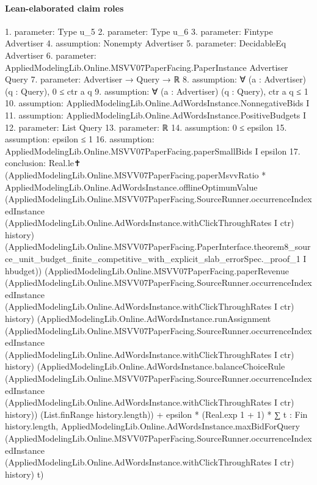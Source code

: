 \documentclass[10pt]{article}
\begin{document}
\paragraph{Lean-elaborated claim roles}\begin{ReviewVerbatim}
1. parameter: Type u_5
2. parameter: Type u_6
3. parameter: Fintype Advertiser
4. assumption: Nonempty Advertiser
5. parameter: DecidableEq Advertiser
6. parameter: AppliedModelingLib.Online.MSVV07PaperFacing.PaperInstance Advertiser Query
7. parameter: Advertiser → Query → ℝ
8. assumption: ∀ (a : Advertiser) (q : Query), 0 ≤ ctr a q
9. assumption: ∀ (a : Advertiser) (q : Query), ctr a q ≤ 1
10. assumption: AppliedModelingLib.Online.AdWordsInstance.NonnegativeBids I
11. assumption: AppliedModelingLib.Online.AdWordsInstance.PositiveBudgets I
12. parameter: List Query
13. parameter: ℝ
14. assumption: 0 ≤ epsilon
15. assumption: epsilon ≤ 1
16. assumption: AppliedModelingLib.Online.MSVV07PaperFacing.paperSmallBids I epsilon
17. conclusion: Real.le✝
  (AppliedModelingLib.Online.MSVV07PaperFacing.paperMsvvRatio *
    AppliedModelingLib.Online.AdWordsInstance.offlineOptimumValue
      (AppliedModelingLib.Online.MSVV07PaperFacing.SourceRunner.occurrenceIndexedInstance
        (AppliedModelingLib.Online.AdWordsInstance.withClickThroughRates I ctr) history)
      (AppliedModelingLib.Online.MSVV07PaperFacing.PaperInterface.theorem8_source_unit_budget_finite_competitive_with_explicit_slab_errorSpec._proof_1
        I hbudget))
  (AppliedModelingLib.Online.MSVV07PaperFacing.paperRevenue
      (AppliedModelingLib.Online.MSVV07PaperFacing.SourceRunner.occurrenceIndexedInstance
        (AppliedModelingLib.Online.AdWordsInstance.withClickThroughRates I ctr) history)
      (AppliedModelingLib.Online.AdWordsInstance.runAssignment
        (AppliedModelingLib.Online.MSVV07PaperFacing.SourceRunner.occurrenceIndexedInstance
          (AppliedModelingLib.Online.AdWordsInstance.withClickThroughRates I ctr) history)
        (AppliedModelingLib.Online.AdWordsInstance.balanceChoiceRule
          (AppliedModelingLib.Online.MSVV07PaperFacing.SourceRunner.occurrenceIndexedInstance
            (AppliedModelingLib.Online.AdWordsInstance.withClickThroughRates I ctr) history))
        (List.finRange history.length)) +
    epsilon * (Real.exp 1 + 1) *
      ∑ t : Fin history.length,
        AppliedModelingLib.Online.AdWordsInstance.maxBidForQuery
          (AppliedModelingLib.Online.MSVV07PaperFacing.SourceRunner.occurrenceIndexedInstance
            (AppliedModelingLib.Online.AdWordsInstance.withClickThroughRates I ctr) history)
          t)
\end{ReviewVerbatim}
\end{document}
